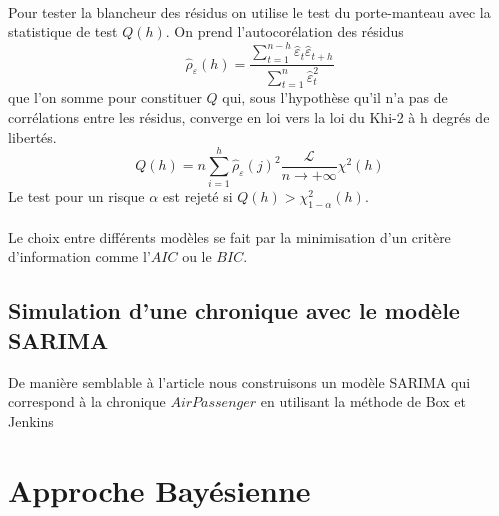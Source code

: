 \documentclass{article}
\theoremstyle{definition}
\theoremstyle{remark}
\begin{document}
\paragraph{}
Pour tester la \og{} blancheur \fg des résidus on utilise le test du porte-manteau avec la statistique de test $Q(h)$.
On prend l'autocorélation des résidus
\[
	\widehat{\rho}_{\varepsilon}(h)=\frac{\sum_{t=1}^{n-h} \widehat{\varepsilon}_{t} \widehat{\varepsilon}_{t+h}}{\sum_{t=1}^{n} \widehat{\varepsilon}_{t}^{2}}
\] 
que l'on somme pour constituer $Q$ qui, sous l'hypothèse qu'il n'a pas de corrélations entre les résidus, converge en loi 
vers la loi du Khi-2 à h degrés de libertés.	
\begin{equation}
	Q(h)=n \sum_{i=1}^{h} \widehat{\rho}_{\varepsilon}(j)^{2} \frac{\mathcal{L}}{n \rightarrow+\infty} \chi^{2}(h)
\end{equation}
Le test pour un risque $\alpha$ est rejeté si $Q(h) >  \chi_{1-\alpha}^{2}(h)$.

\paragraph{} 
Le choix entre différents modèles se fait par la minimisation d'un critère d'information comme l'$AIC$ ou le $BIC$.



\subsection{Simulation d'une chronique avec le modèle SARIMA}
De manière semblable à l'article nous construisons un modèle SARIMA qui correspond à la chronique $AirPassenger$ en utilisant
la méthode de Box et Jenkins









\section{Approche Bayésienne}
\end{document}
